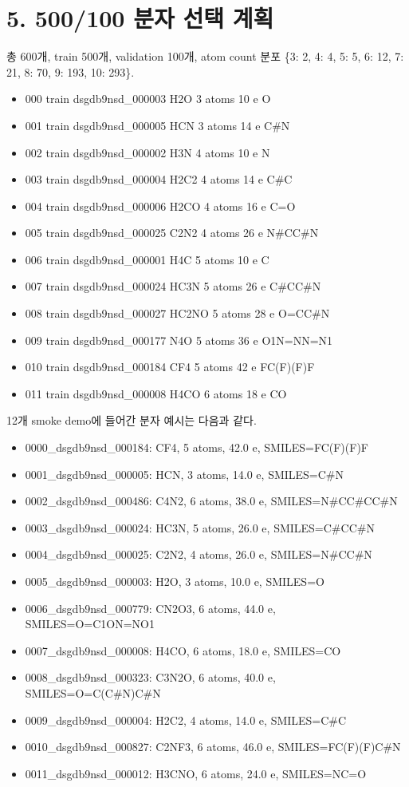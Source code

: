 \documentclass[11pt]{article}
\begin{document}
\section*{5. 500/100 분자 선택 계획}
총 600개, train 500개, validation 100개, atom count 분포 \{3: 2, 4: 4, 5: 5, 6: 12, 7: 21, 8: 70, 9: 193, 10: 293\}.
\begin{itemize}[leftmargin=1.5em]
\item 000 train dsgdb9nsd\_000003  H2O  3 atoms  10 e  O
\item 001 train dsgdb9nsd\_000005  HCN  3 atoms  14 e  C\#N
\item 002 train dsgdb9nsd\_000002  H3N  4 atoms  10 e  N
\item 003 train dsgdb9nsd\_000004  H2C2  4 atoms  14 e  C\#C
\item 004 train dsgdb9nsd\_000006  H2CO  4 atoms  16 e  C=O
\item 005 train dsgdb9nsd\_000025  C2N2  4 atoms  26 e  N\#CC\#N
\item 006 train dsgdb9nsd\_000001  H4C  5 atoms  10 e  C
\item 007 train dsgdb9nsd\_000024  HC3N  5 atoms  26 e  C\#CC\#N
\item 008 train dsgdb9nsd\_000027  HC2NO  5 atoms  28 e  O=CC\#N
\item 009 train dsgdb9nsd\_000177  N4O  5 atoms  36 e  O1N=NN=N1
\item 010 train dsgdb9nsd\_000184  CF4  5 atoms  42 e  FC(F)(F)F
\item 011 train dsgdb9nsd\_000008  H4CO  6 atoms  18 e  CO
\end{itemize}
12개 smoke demo에 들어간 분자 예시는 다음과 같다.
\begin{itemize}[leftmargin=1.5em]
\item 0000\_dsgdb9nsd\_000184: CF4, 5 atoms, 42.0 e, SMILES=FC(F)(F)F
\item 0001\_dsgdb9nsd\_000005: HCN, 3 atoms, 14.0 e, SMILES=C\#N
\item 0002\_dsgdb9nsd\_000486: C4N2, 6 atoms, 38.0 e, SMILES=N\#CC\#CC\#N
\item 0003\_dsgdb9nsd\_000024: HC3N, 5 atoms, 26.0 e, SMILES=C\#CC\#N
\item 0004\_dsgdb9nsd\_000025: C2N2, 4 atoms, 26.0 e, SMILES=N\#CC\#N
\item 0005\_dsgdb9nsd\_000003: H2O, 3 atoms, 10.0 e, SMILES=O
\item 0006\_dsgdb9nsd\_000779: CN2O3, 6 atoms, 44.0 e, SMILES=O=C1ON=NO1
\item 0007\_dsgdb9nsd\_000008: H4CO, 6 atoms, 18.0 e, SMILES=CO
\item 0008\_dsgdb9nsd\_000323: C3N2O, 6 atoms, 40.0 e, SMILES=O=C(C\#N)C\#N
\item 0009\_dsgdb9nsd\_000004: H2C2, 4 atoms, 14.0 e, SMILES=C\#C
\item 0010\_dsgdb9nsd\_000827: C2NF3, 6 atoms, 46.0 e, SMILES=FC(F)(F)C\#N
\item 0011\_dsgdb9nsd\_000012: H3CNO, 6 atoms, 24.0 e, SMILES=NC=O
\end{itemize}
\end{document}
